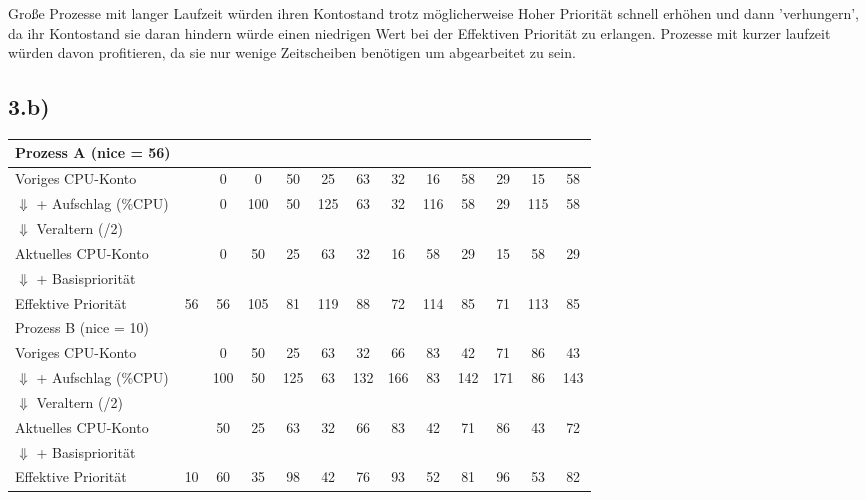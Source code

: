 \documentclass{ti2}
\begin{document}
Große Prozesse mit langer Laufzeit würden ihren Kontostand trotz möglicherweise Hoher Priorität schnell erhöhen und dann 'verhungern', da ihr Kontostand sie daran hindern würde einen niedrigen Wert bei der Effektiven Priorität zu erlangen. Prozesse mit kurzer laufzeit würden davon profitieren, da sie nur wenige Zeitscheiben benötigen um abgearbeitet zu sein.

\subsection*{3.b)}

\begin{tabular}{l|c c c c c c c c c c c c}
	Prozess A (nice = 56)            & & & & & & & & & & & & \\
	\hline
	Voriges CPU-Konto                &   & 0 & 0  &  50&  25&  63&  32&  16&  58&  29&  15&  58\\
	$\Downarrow$ + Aufschlag (\%CPU) &   & 0 & 100&  50& 125&  63&  32& 116&  58&  29& 115&  58\\
	$\Downarrow$ Veraltern (/2)      &   &   &    &    &    &    &    &    &    &    &    &    \\
	Aktuelles CPU-Konto              &   & 0 &  50&  25&  63&  32&  16&  58&  29&  15&  58&  29\\
	$\Downarrow$ + Basispriorität    &   &   &    &    &    &    &    &    &    &    &    &    \\
	Effektive Priorität              & 56& 56& 105&  81& 119&  88&  72& 114&  85&  71& 113&  85\\
	\hline
	\hline
	Prozess B (nice = 10)            & & & & & & & & & & & & \\
	\hline
	Voriges CPU-Konto                &   & 0  & 50&  25&  63&  32&  66&  83&  42&  71&  86&  43\\
	$\Downarrow$ + Aufschlag (\%CPU) &   & 100& 50& 125&  63& 132& 166&  83& 142& 171&  86& 143\\
	$\Downarrow$ Veraltern (/2)      &   &    &   &    &    &    &    &    &    &    &    &    \\
	Aktuelles CPU-Konto              &   & 50 & 25&  63&  32&  66&  83&  42&  71&  86&  43&  72\\
	$\Downarrow$ + Basispriorität    &   &    &   &    &    &    &    &    &    &    &    &    \\
	Effektive Priorität              & 10& 60 & 35&  98&  42&  76&  93&  52&  81&  96&  53&  82\\
\end{tabular}\\
\end{document}
